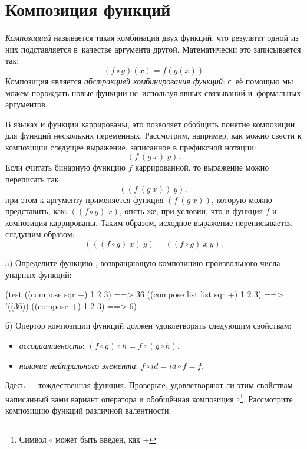 \section{Композиция функций}%
%
\emph{Композицией} называется такая комбинация двух функций, что результат одной из них подставляется в~качестве аргумента другой. Математически это записывается так:$$(f \circ g)(x) = f(g(x))$$
Композиция является \emph{абстракцией комбинирования функций}: с~её помощью мы можем порождать новые функции не~используя явных связываний и~формальных аргументов.

В языках \Scheme и  функции каррированы, это позволяет обобщить понятие композиции  для функций нескольких переменных. Рассмотрим, например, как можно свести к композиции следущее выражение, записанное в префиксной нотации:
$$(f~(g~x)~y).$$
Если считать бинарную функцию $f$ каррированной, то выражение можно переписать так:
$$((f~(g~x))~y),$$
при этом к аргументу  применяется функция $(f~(g~x))$, которую можно представить, как: $((f\circ g)~x)$, опять же, при условии, что и функция $f$ и композиция каррированы. Таким образом, исходное выражение переписывается следущим образом: $$(((f \circ g)~x)~y) = ((f \circ g)~x~y).$$

\newpage
\begin{Assignment}
a) Определите функцию , возвращающую композицию произвольного числа унарных функций:
\begin{Specification}
(test
  ((compose sqr +) 1 2 3)           ==> 36
  ((compose list list sqr +) 1 2 3) ==> '((36))
  ((compose +) 1 2 3)               ==> 6)
\end{Specification}

б) Опертор композиции функций должен удовлетворять следующим свойствам:
\begin{itemize}
  \item \emph{ассоциативность}: $(f \circ g) \circ h = f \circ (g \circ h)$,
  \item \emph{наличие нейтрального элемента}: $f \circ id = id \circ f = f$.
\end{itemize}
Здесь  --- тождественная функция.
Проверьте, удовлетворяют ли этим свойствам написанный вами вариант оператора  и обобщённая композиция $\circ$\footnote{Символ $\circ$ может быть введён, как \s{\\circ} +  \s{\\}}. Рассмотрите  композицию функций различной валентности.
\end{Assignment}


